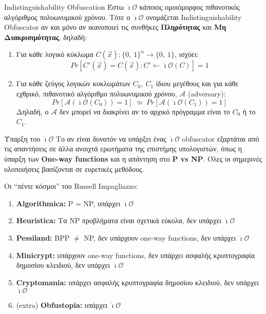 \documentclass[xcolor=dvipsnames]{beamer}
\newcommand{\lt}{\latintext}
\newcommand{\ios}{\dot{\imath}\mathcal{O}}
\newcommand{\io}[1]{\dot{\imath}\mathcal{O}(#1)}
\newcommand{\As}{\mathcal{A}}
\newcommand{\A}[1]{\mathcal{A}(#1)}
\begin{document}
\begin{frame}{\lt Indistinguishability Obfuscation}
Έστω $\ios$ κάποιος ομοιόμορφος πιθανοτικός αλγόριθμος πολυωνυμικού χρόνου. Τότε ο $\ios$ ονομάζεται {\lt Indistinguishability Obfuscator} αν και μόνο αν ικανοποιεί τις συνθήκες \textbf{Πληρότητας} και \textbf{Μη Διακρισιμότητας}, δηλαδή: \pause

\hfill

\begin{enumerate}
	\item Για κάθε λογικό κύκλωμα $C(\vec{x}): \{0,\:1\}^{n} \rightarrow \{0,\:1\}$, ισχύει:
	\[
		Pr[C'(\vec{x}) = C(\vec{x}): C' \leftarrow \io{C}] = 1
	\] \pause \vspace{-0.2in}
	\item Για κάθε ζεύγος λογικών κυκλωμάτων $C_0,\:C_1$ ίδιου μεγέθους και για κάθε εχθρικό, πιθανοτικό αλγόριθμο πολυωνυμικού χρόνου, $\As$ {\lt (adversary)}:
	\[
		Pr[\A{\io{C_0}}=1]\; \simeq\; Pr[\A{\io{C_1}}=1]
	\]
	Δηλαδή, ο $\As$ δεν μπορεί να διακρίνει αν το αρχικό πρόγραμμα είναι το $C_0$ ή το $C_1$. 
\end{enumerate}

\end{frame}

\begin{frame}{Ύπαρξη του $\ios$}
Το αν είναι δυνατόν να υπάρξει ένας $\ios$ {\lt obfuscator} εξαρτάται από τις απαντήσεις σε άλλα ανοιχτά ερωτήματα της επιστήμης υπολογιστών, όπως η ύπαρξη των \textbf{{\lt One-way functions}} και η απάντηση στο \textbf{{\lt P vs NP}}. Όλες οι σημερινές υλοποιήσεις βασίζονται σε ευρετικές μεθόδους.\pause

\hfill

Οι \enquote{πέντε κόσμοι} του {\lt Russell Impagliazzo}:
\begin{enumerate}
	\item \textbf{{\lt Algorithmica:}} {\lt P = NP}, υπάρχει $\ios$
	\item \textbf{{\lt Heuristica:}} Τα {\lt NP} προβλήματα είναι σχετικά εύκολα, δεν υπάρχει $\ios$
	\item \textbf{{\lt Pessiland:}} {\lt BPP} $\neq$ {\lt NP}, δεν υπάρχουν {\lt one-way functions}, δεν υπάρχει $\ios$
	\item \textbf{{\lt Minicrypt:}} υπάρχουν {\lt one-way functions}, δεν υπάρχει ασφαλής κρυπτογραφία δημοσίου κλειδιού, δεν υπάρχει $\ios$
	\item \textbf{{\lt Cryptomania:}} υπάρχει ασφαλής κρυπτογραφία δημοσίου κλειδιού, δεν υπάρχει $\ios$
	\item {\lt (extra)} \textbf{{\lt Obfustopia:}} υπάρχει $\ios$
\end{enumerate}

\end{frame}
\end{document}
